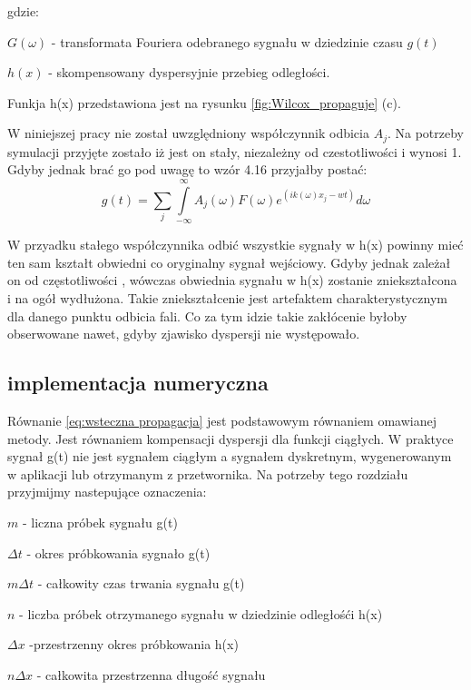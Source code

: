 gdzie:

$G(\omega)$ - transformata Fouriera odebranego sygnału w dziedzinie czasu $g(t)$

$h(x)$ - skompensowany dyspersyjnie przebieg odległości.

Funkja h(x) przedstawiona jest na rysunku \ref{fig:Wilcox_propaguje} (c).

W niniejszej pracy nie został uwzględniony współczynnik odbicia $A_j$. Na potrzeby symulacji przyjęte zostało iż jest on stały, niezależny od czestotliwości i wynosi 1. Gdyby jednak brać go pod uwagę to wzór 4.16 przyjałby postać:
\begin{equation}
g(t) = \sum \limits _{j}\int\limits_{-\infty}^{\infty}A_j(\omega)F(\omega)e^(ik(\omega)x_j-wt)d\omega
\end{equation}

W przyadku stałego współczynnika odbić wszystkie sygnały w h(x) powinny mieć ten sam kształt obwiedni co oryginalny sygnał wejściowy. Gdyby jednak zależał on od częstotliwości , wówczas obwiednia sygnału w h(x) zostanie zniekształcona i na ogół wydłużona. Takie zniekształcenie jest artefaktem charakterystycznym dla danego punktu odbicia fali. Co za tym idzie takie zakłócenie byłoby obserwowane nawet, gdyby zjawisko dyspersji nie występowało. 

\subsection{implementacja numeryczna}
Równanie \ref{eq:wsteczna propagacja} jest podstawowym równaniem omawianej metody. Jest równaniem kompensacji dyspersji dla funkcji ciągłych. W praktyce sygnał g(t) nie jest sygnałem ciągłym a sygnałem dyskretnym, wygenerowanym w aplikacji lub otrzymanym z przetwornika. Na potrzeby tego rozdziału przyjmijmy nastepujące oznaczenia:

$m$ - liczna próbek sygnału g(t)

$\Delta t$ - okres próbkowania sygnało g(t)

$m\Delta t$ - całkowity czas trwania sygnału g(t)

$n$ - liczba próbek otrzymanego sygnału w dziedzinie odległośći h(x)

$\Delta x$ -przestrzenny okres próbkowania h(x)

$n\Delta x$ - całkowita przestrzenna długość sygnału

